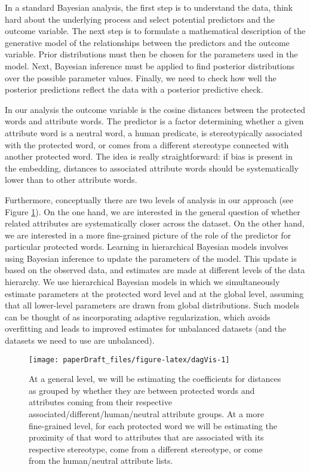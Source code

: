 \documentclass[
  12pt,
  dvipsnames,enabledeprecatedfontcommands]{scrartcl}
\begin{document}
In a standard Bayesian analysis, the first step is to understand the
data, think hard about the underlying process and select potential
predictors and the outcome variable. The next step is to formulate a
mathematical description of the generative model of the relationships
between the predictors and the outcome variable. Prior distributions
must then be chosen for the parameters used in the model. Next, Bayesian
inference must be applied to find posterior distributions over the
possible parameter values. Finally, we need to check how well the
posterior predictions reflect the data with a posterior predictive
check.

In our analysis the outcome variable is the cosine distances between the
protected words and attribute words. The predictor is a factor
determining whether a given attribute word is a neutral word, a human
predicate, is stereotypically associated with the protected word, or
comes from a different stereotype connected with another protected word.
The idea is really straightforward: if bias is present in the embedding,
distances to associated attribute words should be systematically lower
than to other attribute words.

Furthermore, conceptually there are two levels of analysis in our
approach (see Figure \ref{fig:visDag}). On the one hand, we are
interested in the general question of whether related attributes are
systematically closer across the dataset. On the other hand, we are
interested in a more fine-grained picture of the role of the predictor
for particular protected words. Learning in hierarchical Bayesian models
involves using Bayesian inference to update the parameters of the model.
This update is based on the observed data, and estimates are made at
different levels of the data hierarchy. We use hierarchical Bayesian
models in which we simultaneously estimate parameters at the protected
word level and at the global level, assuming that all lower-level
parameters are drawn from global distributions. Such models can be
thought of as incorporating adaptive regularization, which avoids
overfitting and leads to improved estimates for unbalanced datasets (and
the datasets we need to use are unbalanced).

\begin{figure}[H]

\begin{center}\texttt{[image: paperDraft\_files/figure-latex/dagVis-1]} \end{center}

\caption{At a general level, we will be estimating the coefficients for distances as grouped by whether they are between protected words and attributes coming from their respective associated/different/human/neutral attribute groups. At a more fine-grained level, for each protected word we will be estimating the proximity of that word to attributes that are associated with its respective stereotype, come from a different stereotype, or come from the human/neutral attribute lists.}
\label{fig:visDag}
\end{figure}
\end{document}
